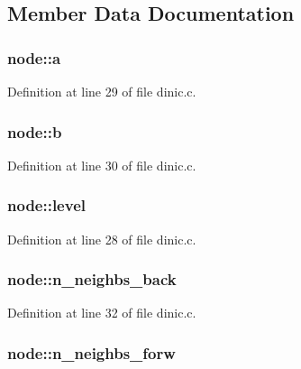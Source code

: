 \subsection{Member Data Documentation}
\hypertarget{structnode_ab3ebb77648e3179638a796c91cf35050}{
\subsubsection[{a}]{ {\bf node::a}}}
\label{structnode_ab3ebb77648e3179638a796c91cf35050}


Definition at line 29 of file dinic.c.

\hypertarget{structnode_a47676bd29ce98f47afc8beb738eaa395}{
\subsubsection[{b}]{ {\bf node::b}}}
\label{structnode_a47676bd29ce98f47afc8beb738eaa395}


Definition at line 30 of file dinic.c.

\hypertarget{structnode_a36646eb4400739b7f55f75d9234d50b3}{
\subsubsection[{level}]{ {\bf node::level}}}
\label{structnode_a36646eb4400739b7f55f75d9234d50b3}


Definition at line 28 of file dinic.c.

\hypertarget{structnode_a96601323c6655323e55cafd93415110a}{
\subsubsection[{n\_\-neighbs\_\-back}]{ {\bf node::n\_\-neighbs\_\-back}}}
\label{structnode_a96601323c6655323e55cafd93415110a}


Definition at line 32 of file dinic.c.

\hypertarget{structnode_ad0b9f01f833dc473ce11a6849bce3bc6}{
\subsubsection[{n\_\-neighbs\_\-forw}]{ {\bf node::n\_\-neighbs\_\-forw}}}
\label{structnode_ad0b9f01f833dc473ce11a6849bce3bc6}


